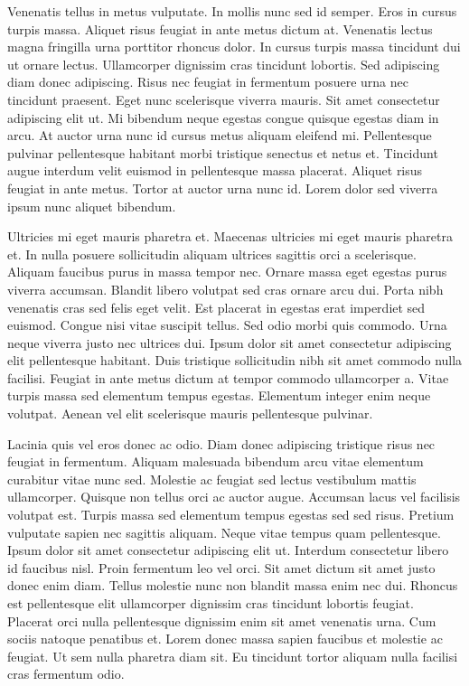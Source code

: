 \documentclass[11pt,a4paper]{article}
\begin{document}
Venenatis tellus in metus vulputate. In mollis nunc sed id semper. Eros in cursus turpis massa. Aliquet risus feugiat in ante metus dictum at. Venenatis lectus magna fringilla urna porttitor rhoncus dolor. In cursus turpis massa tincidunt dui ut ornare lectus. Ullamcorper dignissim cras tincidunt lobortis. Sed adipiscing diam donec adipiscing. Risus nec feugiat in fermentum posuere urna nec tincidunt praesent. Eget nunc scelerisque viverra mauris. Sit amet consectetur adipiscing elit ut. Mi bibendum neque egestas congue quisque egestas diam in arcu. At auctor urna nunc id cursus metus aliquam eleifend mi. Pellentesque pulvinar pellentesque habitant morbi tristique senectus et netus et. Tincidunt augue interdum velit euismod in pellentesque massa placerat. Aliquet risus feugiat in ante metus. Tortor at auctor urna nunc id. Lorem dolor sed viverra ipsum nunc aliquet bibendum.

Ultricies mi eget mauris pharetra et. Maecenas ultricies mi eget mauris pharetra et. In nulla posuere sollicitudin aliquam ultrices sagittis orci a scelerisque. Aliquam faucibus purus in massa tempor nec. Ornare massa eget egestas purus viverra accumsan. Blandit libero volutpat sed cras ornare arcu dui. Porta nibh venenatis cras sed felis eget velit. Est placerat in egestas erat imperdiet sed euismod. Congue nisi vitae suscipit tellus. Sed odio morbi quis commodo. Urna neque viverra justo nec ultrices dui. Ipsum dolor sit amet consectetur adipiscing elit pellentesque habitant. Duis tristique sollicitudin nibh sit amet commodo nulla facilisi. Feugiat in ante metus dictum at tempor commodo ullamcorper a. Vitae turpis massa sed elementum tempus egestas. Elementum integer enim neque volutpat. Aenean vel elit scelerisque mauris pellentesque pulvinar.

Lacinia quis vel eros donec ac odio. Diam donec adipiscing tristique risus nec feugiat in fermentum. Aliquam malesuada bibendum arcu vitae elementum curabitur vitae nunc sed. Molestie ac feugiat sed lectus vestibulum mattis ullamcorper. Quisque non tellus orci ac auctor augue. Accumsan lacus vel facilisis volutpat est. Turpis massa sed elementum tempus egestas sed sed risus. Pretium vulputate sapien nec sagittis aliquam. Neque vitae tempus quam pellentesque. Ipsum dolor sit amet consectetur adipiscing elit ut. Interdum consectetur libero id faucibus nisl. Proin fermentum leo vel orci. Sit amet dictum sit amet justo donec enim diam. Tellus molestie nunc non blandit massa enim nec dui. Rhoncus est pellentesque elit ullamcorper dignissim cras tincidunt lobortis feugiat. Placerat orci nulla pellentesque dignissim enim sit amet venenatis urna. Cum sociis natoque penatibus et. Lorem donec massa sapien faucibus et molestie ac feugiat. Ut sem nulla pharetra diam sit. Eu tincidunt tortor aliquam nulla facilisi cras fermentum odio.
\end{document}

